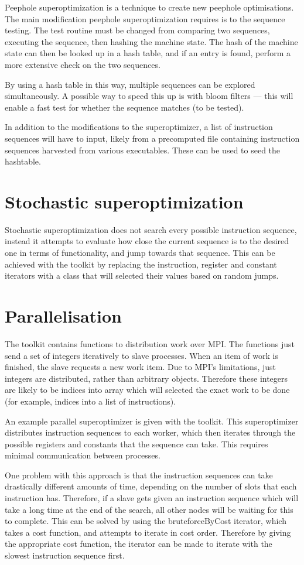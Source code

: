 \documentclass{article}
\begin{document}
Peephole superoptimization is a technique to create new peephole optimisations. The main modification peephole superoptimization requires is to the sequence testing. The test routine must be changed from comparing two sequences, executing the sequence, then hashing the machine state. The hash of the machine state can then be looked up in a hash table, and if an entry is found, perform a more extensive check on the two sequences.

By using a hash table in this way, multiple sequences can be explored simultaneously. A possible way to speed this up is with bloom filters --- this will enable a fast test for whether the sequence matches (to be tested).

In addition to the modifications to the superoptimizer, a list of instruction sequences will have to input, likely from a precomputed file containing instruction sequences harvested from various executables. These can be used to seed the hashtable.

\section{Stochastic superoptimization}

Stochastic superoptimization does not search every possible instruction sequence, instead it attempts to evaluate how close the current sequence is to the desired one in terms of functionality, and jump towards that sequence. This can be achieved with the toolkit by replacing the instruction, register and constant iterators with a class that will selected their values based on random jumps.

\section{Parallelisation}

The toolkit contains functions to distribution work over MPI. The functions just send a set of integers iteratively to slave processes. When an item of work is finished, the slave requests a new work item. Due to MPI's limitations, just integers are distributed, rather than arbitrary objects. Therefore these integers are likely to be indices into array which will selected the exact work to be done (for example, indices into a list of instructions).

An example parallel superoptimizer is given with the toolkit. This superoptimizer distributes instruction sequences to each worker, which then iterates through the possible registers and constants that the sequence can take. This requires minimal communication between processes.

One problem with this approach is that the instruction sequences can take drastically different amounts of time, depending on the number of slots that each instruction has. Therefore, if a slave gets given an instruction sequence which will take a long time at the end of the search, all other nodes will be waiting for this to complete. This can be solved by using the bruteforceByCost iterator, which takes a cost function, and attempts to iterate in cost order. Therefore by giving the appropriate cost function, the iterator can be made to iterate with the slowest instruction sequence first.
\end{document}
